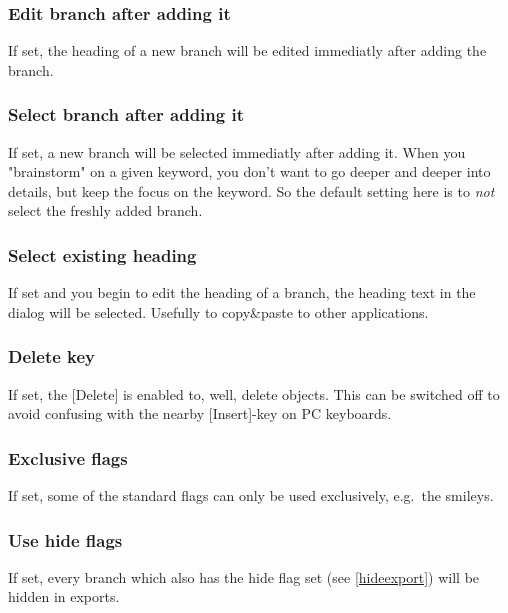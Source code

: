 \documentclass[12pt,a4paper]{article}
\newcommand{\key}[1]{[#1]}
\begin{document}
\begin{appendix}
\subsubsection*{Edit branch after adding it}
    If set, the heading of a new branch will be edited immediatly after
    adding the branch.

\subsubsection*{Select branch after adding it}
    If set, a new branch will be selected immediatly after adding it.
    When you "brainstorm" on a given keyword, you don't want to go
    deeper and deeper into details, but keep the focus on the keyword.
    So the default setting here is to {\em not} select the freshly added
    branch.
    
\subsubsection*{Select existing heading}
    If set and you begin to edit the heading of a branch, the heading text in
    the dialog will be selected. Usefully to copy\&paste to other
    applications.

\subsubsection*{Delete key}
    If set, the \key{Delete} is enabled to, well, delete objects. This
    can be switched off to avoid confusing with the nearby
    \key{Insert}-key on PC keyboards.

\subsubsection*{Exclusive flags}
    If set, some of the standard flags can only be used exclusively,
    e.g.~the smileys.

\subsubsection*{Use hide flags}
    If set, every branch which also has the hide flag set (see
    \ref{hideexport}) will be hidden in exports.


\end{appendix}
\end{document}
